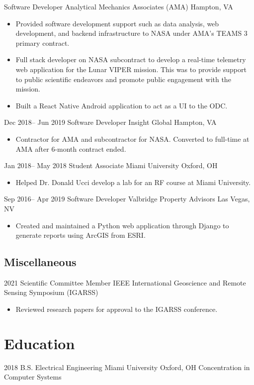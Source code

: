 \documentclass[11pt,a4paper]{moderncv}
\begin{document}
{Software Developer}
{Analytical Mechanics Associates (AMA)}
{Hampton, VA}
{}
{
    \begin{itemize}
        \item{Provided software development support such as data analysis, web development, and backend infrastructure to NASA under AMA's TEAMS 3 primary contract.}
        \item{Full stack developer on NASA subcontract to develop a real-time telemetry web application for the Lunar VIPER mission. This was to provide support to public scientific endeavors and promote public engagement with the mission.}
        \item{Built a React Native Android application to act as a UI to the ODC.}
    \end{itemize}
}
\cventry
{Dec 2018-- Jun 2019  }
{Software Developer}
{Insight Global}
{Hampton, VA}
{}
{
    \begin{itemize}
        \item{Contractor for AMA and subcontractor for NASA. Converted to full-time at AMA after 6-month contract ended.}
    \end{itemize}
}
\cventry
{Jan 2018-- May 2018  }
{Student Associate}
{Miami University}
{Oxford, OH}
{}
{
    \begin{itemize}
        \item{Helped Dr. Donald Ucci develop a lab for an RF course at Miami University.}
    \end{itemize}
}
\cventry
{Sep 2016-- Apr 2019  }
{Software Developer}
{Valbridge Property Advisors}
{Las Vegas, NV}
{}
{
    \begin{itemize}
        \item{Created and maintained a Python web application through Django to generate reports using ArcGIS from ESRI.}
    \end{itemize}
}
\subsection{Miscellaneous}
\cventry
{2021}
{Scientific Committee Member}
{IEEE International Geoscience and Remote Sensing Symposium (IGARSS)}
{}
{}
{
    \begin{itemize}
        \item{Reviewed research papers for approval to the IGARSS conference.}
    \end{itemize}
}

\section{Education}
\cventry
{2018}
{B.S. Electrical Engineering}
{Miami University}
{Oxford, OH}
{}
{Concentration in Computer Systems}
\end{document}
